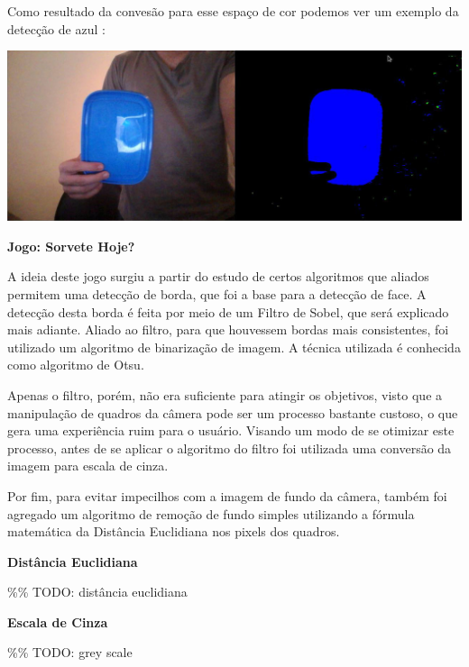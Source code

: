 \documentclass[a4paper]{article}
\begin{document}
Como resultado da convesão para esse espaço de cor podemos ver um exemplo da detecção de azul :

\vspace{5.00mm}
\centering
\includegraphics[scale=0.3]{img2.jpg}

\vspace{5.00mm}


\begin{flushleft}
\textbf{\large Jogo: Sorvete Hoje?}
\end{flushleft}
\raggedright

A ideia deste jogo surgiu a partir do estudo de certos algoritmos que aliados permitem uma detecção de borda, que foi a base para a detecção de face. A detecção desta borda é feita por meio de um Filtro de Sobel, que será explicado mais adiante. Aliado ao filtro, para que houvessem bordas mais consistentes, foi utilizado um algoritmo de binarização de imagem. A técnica utilizada é conhecida como algoritmo de Otsu.

Apenas o filtro, porém, não era suficiente para atingir os objetivos, visto que a manipulação de quadros da câmera pode ser um processo bastante custoso, o que gera uma experiência ruim para o usuário. Visando um modo de se otimizar este processo, antes de se aplicar o algoritmo do filtro foi utilizada uma conversão da imagem para escala de cinza.

Por fim, para evitar impecilhos com a imagem de fundo da câmera, também foi agregado um algoritmo de remoção de fundo simples utilizando a fórmula matemática da Distância Euclidiana nos pixels dos quadros.

\begin{flushleft}
\textbf{\large Distância Euclidiana}
\end{flushleft}
\%\% TODO: distância euclidiana


\begin{flushleft}
\textbf{\large Escala de Cinza}
\end{flushleft}
\%\% TODO: grey scale
\end{document}
